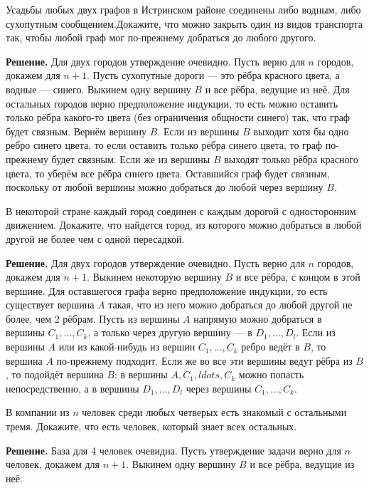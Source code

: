 \newpage

\hspace{3mm}

 Усадьбы любых двух графов в Истринском районе соединены либо водным, либо сухопутным сообщением.Докажите, что можно закрыть один из видов транспорта так, чтобы любой граф мог по-прежнему добраться до любого другого.
    
\textbf{Решение.} Для двух городов утверждение очевидно. Пусть верно для $n$ городов, докажем для $n+1$. Пусть сухопутные дороги --- это рёбра красного цвета, а водные --- синего. Выкинем одну вершину $B$ и все рёбра, ведущие из неё. Для остальных городов верно предположение индукции, то есть можно оставить только рёбра какого-то цвета (без ограничения общности синего) так, что граф будет связным. Вернём вершину $B$. Если из вершины $B$ выходит хотя бы одно ребро синего цвета, то если оставить только рёбра синего цвета, то граф по-прежнему будет связным. Если же из вершины $B$ выходят только рёбра красного цвета, то уберём все рёбра синего цвета. Оставшийся граф будет связным, поскольку от любой вершины можно добраться до любой через вершину $B$.

 В некоторой стране каждый город соединен с каждым дорогой с односторонним движением. Докажите, что найдется город, из которого можно добраться в любой другой не более чем с одной пересадкой.
    
\textbf{Решение.} Для двух городов утверждение очевидно. Пусть верно для $n$ городов, докажем для $n+1$. Выкинем некоторую вершину $B$ и все рёбра, с концом в этой вершине. Для оставшегося графа верно предположение индукции, то есть существует вершина $A$ такая, что из него можно добраться до любой другой не более, чем 2 рёбрам. Пусть из вершины $A$ напрямую можно добраться в вершины $C_1, \ldots, C_k$, а только через другую вершину --- в $D_1, \ldots, D_l$. Если из вершины $A$ или из какой-нибудь из вершин $C_1, \ldots, C_k$ ребро ведёт в $B$, то вершина $A$ по-прежнему подходит. Если же во все эти вершины ведут рёбра из $B$, то подойдёт вершина $B$: в вершины $A, C_1, ldots, C_k$ можно попасть непосредственно, а в вершины $D_1, \ldots, D_l$ через вершины $C_1, \ldots, C_k$.

 В компании из $n$ человек среди любых четверых есть знакомый с остальными тремя. Докажите, что есть человек, который знает всех остальных.
    
\textbf{Решение.} База для 4 человек очевидна. Пусть утверждение задачи верно для $n$ человек, докажем для $n+1$. Выкинем одну вершину $B$ и все рёбра, ведущие из неё. 

